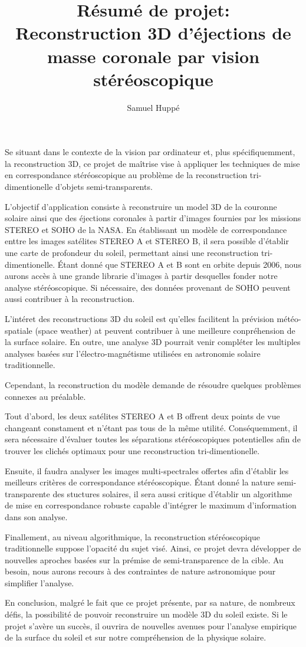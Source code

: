 \documentclass[10pt,a4paper]{article}
\author{Samuel Huppé}
\title{Résumé de projet: \\ Reconstruction 3D d'éjections de masse coronale par vision stéréoscopique}
\begin{document}
\maketitle

Se situant dans le contexte de la vision par ordinateur et, plus spécifiquemment, la reconstruction 3D, ce projet de maîtrise vise à appliquer les techniques de mise en correspondance stéréoscopique au problème de la reconstruction tri-dimentionelle d'objets semi-transparents. 

\noindent L’objectif d'application consiste à reconstruire un model 3D de la couronne solaire ainsi que des éjections coronales à partir d'images fournies par les missions STEREO et SOHO de la NASA. En établissant un modèle de correspondance enttre les images satélites STEREO A et STEREO B, il sera possible d’établir une carte de profondeur du soleil, permettant ainsi une reconstruction tri-dimentionelle. Étant donné que STEREO A et B sont en orbite depuis 2006, nous aurons accès à une grande librarie d'images à partir desquelles fonder notre analyse stéréoscopique. Si nécessaire, des données provenant de SOHO peuvent aussi contribuer à la reconstruction. 

\noindent L'intéret des reconstructions 3D du soleil est qu'elles facilitent la prévision météo-spatiale (space weather) at peuvent contribuer à une meilleure conpréhension de la surface solaire. En outre, une analyse 3D pourrait venir compléter les multiples analyses basées sur l'électro-magnétisme utilisées en astronomie solaire traditionnelle.

\bigskip

Cependant, la reconstruction du modèle demande de résoudre quelques problèmes connexes au préalable. 

\noindent Tout d’abord, les deux satélites STEREO A et B offrent deux points de vue changeant constament et n’étant pas  tous de la même utilité. Conséquemment, il sera nécessaire d'évaluer toutes les séparations stéréoscopiques potentielles afin de trouver les clichés optimaux pour une reconstruction tri-dimentionelle.  

\noindent Ensuite, il faudra analyser les images multi-spectrales offertes afin d'établir les meilleurs critères de correspondance stéréoscopique. Étant donné la nature semi-transparente des stuctures solaires, il sera aussi critique d'établir un algorithme de mise en correspondance robuste capable d'intégrer le maximum d'information dans son analyse.

\noindent Finallement, au niveau algorithmique, la reconstruction stéréoscopique traditionnelle suppose l'opacité du sujet visé. Ainsi, ce projet devra développer de nouvelles aproches basées sur la prémise de semi-transparence de la cible. Au besoin, nous aurons recours à des contraintes de nature astronomique pour simplifier l'analyse.

\bigskip

En conclusion, malgré le fait que ce projet présente, par sa nature, de nombreux défis, la possibilité de pouvoir reconstruire un modèle 3D du soleil existe. Si le projet s'avère un succès, il ouvrira de nouvelles avenues pour l'analyse empirique de la surface du soleil et sur notre compréhension de la physique solaire. 
\end{document}

